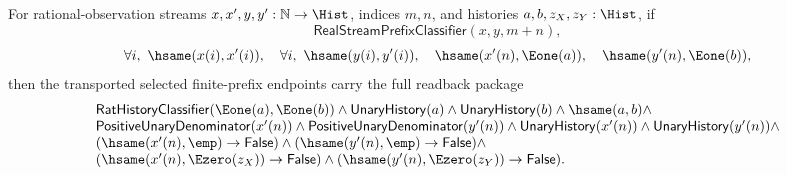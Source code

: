 \begin{theorem}
\label{thm:real-stream-prefix-transported-selected-full-shape-readback-package}
For rational-observation streams $x,x',y,y':\mathbb{N}\to\Hist$, indices
$m,n$, and histories $a,b,z_X,z_Y:\Hist$, if
$$
\mathsf{RealStreamPrefixClassifier}(x,y,m+n),
$$
$$
\forall i,\ \hsame(x(i),x'(i)),\quad
\forall i,\ \hsame(y(i),y'(i)),\quad
\hsame(x'(n),\Eone(a)),\quad
\hsame(y'(n),\Eone(b)),
$$
then the transported selected finite-prefix endpoints carry the full readback
package
$$
\begin{array}{l}
\mathsf{RatHistoryClassifier}(\Eone(a),\Eone(b))\land
\mathsf{UnaryHistory}(a)\land \mathsf{UnaryHistory}(b)\land \hsame(a,b)\land\\
\mathsf{PositiveUnaryDenominator}(x'(n))\land
\mathsf{PositiveUnaryDenominator}(y'(n))\land
\mathsf{UnaryHistory}(x'(n))\land
\mathsf{UnaryHistory}(y'(n))\land\\
(\hsame(x'(n),\emp)\to\mathsf{False})\land
(\hsame(y'(n),\emp)\to\mathsf{False})\land\\
(\hsame(x'(n),\Ezero(z_X))\to\mathsf{False})\land
(\hsame(y'(n),\Ezero(z_Y))\to\mathsf{False}).
\end{array}
$$
\end{theorem}
